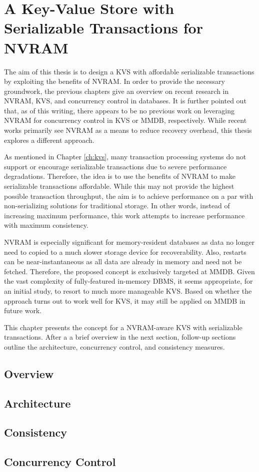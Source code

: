 \chapter{A Key-Value Store with Serializable Transactions for NVRAM}
\label{ch:concept}

The aim of this thesis is to design a KVS with affordable serializable
transactions by exploiting the benefits of NVRAM. In order to provide the
necessary groundwork, the previous chapters give an overview on recent research
in NVRAM, KVS, and concurrency control in databases. It is further pointed out
that, as of this writing, there appears to be no previous work on leveraging
NVRAM for concurrency control in KVS or MMDB, respectively. While recent works
primarily see NVRAM as a means to reduce recovery overhead, this thesis explores
a different approach.

As mentioned in Chapter \ref{ch:kvs}, many transaction processing systems do not
support or encourage serializable transactions due to severe performance
degradations. Therefore, the idea is to use the benefits of NVRAM to make
serializable transactions affordable. While this may not provide the highest
possible transaction throughput, the aim is to achieve performance on a par with
non-serializing solutions for traditional storage. In other words, instead of
increasing maximum performance, this work attempts to increase performance with
maximum consistency.

NVRAM is especially significant for memory-resident databases as data no longer
need to copied to a much slower storage device for recoverability. Also,
restarts can be near-instantaneous as all data are already in memory and need
not be fetched. Therefore, the proposed concept is exclusively targeted at MMDB.
Given the vast complexity of fully-featured in-memory DBMS, it seems
appropriate, for an initial study, to resort to much more manageable KVS. Based
on whether the approach turns out to work well for KVS, it may still be applied
on MMDB in future work.

This chapter presents the concept for a NVRAM-aware KVS with serializable
transactions. After a a brief overview in the next section, follow-up sections
outline the architecture, concurrency control, and consistency measures.

\section{Overview}
\label{sec:concept-overview}


\section{Architecture}
\label{sec:concept-arch}

\section{Consistency}
\label{sec:concept-concistency}


\section{Concurrency Control}
\label{sec:concept-cc}
